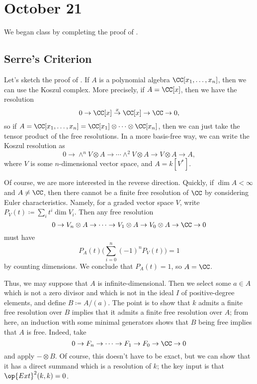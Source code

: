 \documentclass[../notes.tex]{subfiles}
\begin{document}
\section{October 21}
We began class by completing the proof of .

\subsection{Serre's Criterion}
Let's sketch the proof of . If $A$ is a polynomial algebra $\CC[x_1,\ldots,x_n]$, then we can use the Koszul complex. More precisely, if $A=\CC[x]$, then we have the resolution
\[0\to\CC[x]\stackrel x\to\CC[x]\to\CC\to0,\]
so if $A=\CC[x_1,\ldots,x_n]=\CC[x_1]\otimes\cdots\otimes\CC[x_n]$, then we can just take the tensor product of the free resolutions. In a more basis-free way, we can write the Koszul resolution as
\[0\to\land^nV\otimes A\to\cdots\land^2V\otimes A\to V\otimes A\to A,\]
where $V$ is some $n$-dimensional vector space, and $A=k[V^*]$.

Of course, we are more interested in the reverse direction. Quickly, if $\dim A<\infty$ and $A\ne\CC$, then there cannot be a finite free resolution of $\CC$ by considering Euler characteristics. Namely, for a graded vector space $V$, write $P_V(t)\coloneqq\sum_it^i\dim V_i$. Then any free resolution
\[0\to V_n\otimes A\to\cdots\to V_1\otimes A\to V_0\otimes A\to\CC\to0\]
must have
\[P_A(t)\Bigg(\sum_{i=0}^n(-1)^nP_V(t)\Bigg)=1\]
by counting dimensions. We conclude that $P_A(t)=1$, so $A=\CC$.

Thus, we may suppose that $A$ is infinite-dimensional. Then we select some $a\in A$ which is not a zero divisor and which is not in the ideal $I$ of positive-degree elements, and define $B\coloneqq A/(a)$. The point is to show that $k$ admits a finite free resolution over $B$ implies that it admits a finite free resolution over $A$; from here, an induction with some minimal generators shows that $B$ being free implies that $A$ is free. Indeed, take
\[0\to F_n\to\cdots\to F_1\to F_0\to\CC\to0\]
and apply $-\otimes B$. Of course, this doesn't have to be exact, but we can show that it has a direct summand which is a resolution of $k$; the key input is that $\op{Ext}^2(k,k)=0$.
\end{document}
